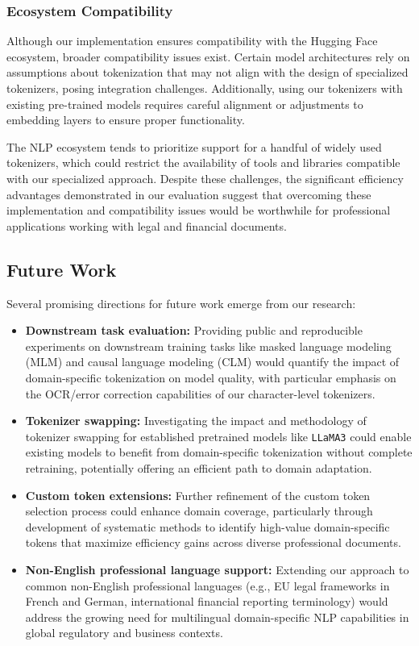 \subsubsection{Ecosystem Compatibility}

Although our implementation ensures compatibility with the Hugging Face ecosystem, broader compatibility issues exist. Certain model architectures rely on assumptions about tokenization that may not align with the design of specialized tokenizers, posing integration challenges. Additionally, using our tokenizers with existing pre-trained models requires careful alignment or adjustments to embedding layers to ensure proper functionality.

The NLP ecosystem tends to prioritize support for a handful of widely used tokenizers, which could restrict the availability of tools and libraries compatible with our specialized approach. Despite these challenges, the significant efficiency advantages demonstrated in our evaluation suggest that overcoming these implementation and compatibility issues would be worthwhile for professional applications working with legal and financial documents.

\subsection{Future Work}

Several promising directions for future work emerge from our research:

\begin{itemize}
    \item \textbf{Downstream task evaluation:} Providing public and reproducible experiments on downstream training tasks like masked language modeling (MLM) and causal language modeling (CLM) would quantify the impact of domain-specific tokenization on model quality, with particular emphasis on the OCR/error correction capabilities of our character-level tokenizers.
    
    \item \textbf{Tokenizer swapping:} Investigating the impact and methodology of tokenizer swapping for established pretrained models like \texttt{LLaMA3} could enable existing models to benefit from domain-specific tokenization without complete retraining, potentially offering an efficient path to domain adaptation.
    
    \item \textbf{Custom token extensions:} Further refinement of the custom token selection process could enhance domain coverage, particularly through development of systematic methods to identify high-value domain-specific tokens that maximize efficiency gains across diverse professional documents.
    
    \item \textbf{Non-English professional language support:} Extending our approach to common non-English professional languages (e.g., EU legal frameworks in French and German, international financial reporting terminology) would address the growing need for multilingual domain-specific NLP capabilities in global regulatory and business contexts.
\end{itemize}